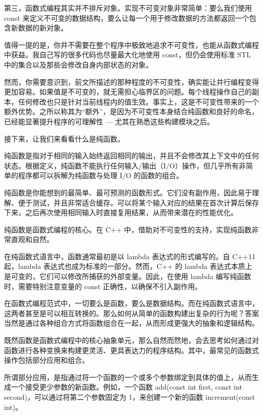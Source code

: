 第三，函数式编程其实并不排斥对象。实现不可变对象非常简单：要么我们使用 const 来定义不可变的数据结构，要么让每一个用于修改数据的方法都返回一个包含新数据的新对象。

值得一提的是，你并不需要在整个程序中极致地追求不可变性，也能从函数式编程中获益。我自己写的很多代码也尽量最大化地使用 const，但仍会使用标准 STL 中的集合以及那些会修改自身内部状态的对象。

然而，你需要意识到，前文所描述的那种程度的不可变性，确实能让并行编程变得更加容易。如果值是不可变的，就无需担心临界区的问题。每个线程操作自己的副本，任何修改也只是针对当前线程内的值生效。事实上，这是不可变性带来的一个额外优势。之所以称其为“额外”，是因为不可变性本身结合纯函数和良好的命名，已经能显著提升程序的可理解性 --- 尤其在熟悉这些构建模块之后。

接下来，让我们来看看什么是纯函数。


纯函数是指对于相同的输入始终返回相同的输出，并且不会修改其上下文中的任何状态。根据定义，纯函数不能执行任何输入/输出（I/O）操作，但几乎所有非简单的程序都可以拆解为纯函数与处理 I/O 的函数的组合。

纯函数是你能想到的最简单、最可预测的函数形式。它们没有副作用，因此易于理解、便于测试，并且非常适合缓存。可以将某个输入对应的结果在首次计算后保存下来，之后再次使用相同输入时直接复用结果，从而带来潜在的性能优化。

纯函数是函数式编程的核心。在 C++ 中，借助对不可变性的支持，实现纯函数非常直观和自然。

在纯函数式语言中，函数通常最初是以 lambda 表达式的形式编写的。自 C++11 起，lambda 表达式也成为标准的一部分。然而，C++ 的 lambda 表达式本质上是可变的，它们可以修改所捕获的外部变量。因此，在使用 lambda 编写纯函数时，需要特别注意变量的 const 正确性，以确保不引入副作用。

在函数式编程范式中，一切要么是函数，要么是数据结构。而在纯函数式语言中，这两者甚至是可以相互转换的。那么如何从简单的函数构建出复杂的行为呢？答案当然是通过各种组合方式将函数组合在一起，从而形成更强大的抽象和逻辑结构。


既然函数是函数式编程中的核心抽象单元，那么自然而然地，会去思考如何通过对函数进行各种变换来构建更灵活、更具表达力的程序结构。其中，最常见的函数式操作包括部分应用和组合。

所谓部分应用，是指通过将一个函数的一个或多个参数绑定到具体的值上，从而生成一个接受更少参数的新函数。例如，一个函数 add(const int first, const int second)，可以通过将第二个参数固定为 1，来创建一个新的函数 increment(const int)。

